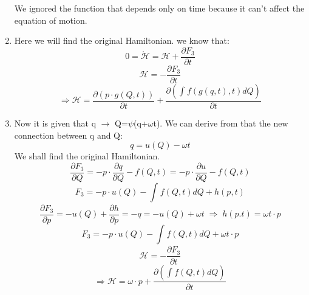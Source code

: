 \documentclass[11pt,fleqn]{article}
\begin{document}
\begin{enumerate}
We ignored the function that depends only on time because it can't affect the equation of motion.
\item Here we will find the original Hamiltonian.
\newline
we know that:
\begin{equation}
0=\grave{\mathcal{H}}=\mathcal{H}+\frac{\partial F_{3}}{\partial t}
\end{equation}
\begin{equation}
\mathcal{H}=-\frac{\partial F_{3}}{\partial t}
\end{equation}
\begin{equation}
\Rightarrow\boxed{\mathcal{H}=\frac{\partial (p\cdot g(Q,t))}{\partial t}+\frac{\partial (\int_{}^{}f(g(q,t),t)dQ)}{\partial t}}
\end{equation}
\item Now it is given that q $\to$ Q=$\psi$(q+$\omega$t). We can derive from that the new connection between q and Q:
\begin{equation}
q=u(Q)-\omega t
\end{equation}
We shall find the original Hamiltonian.
\begin{equation}
\frac{\partial F_{3}}{\partial Q}=-p\cdot\frac{\partial q}{\partial Q}-f(Q,t)=-p\cdot \frac{\partial u}{\partial Q} -f(Q,t)
\end{equation}
\begin{equation}
F_{3}=-p\cdot u(Q)-\int_{}^{} f(Q,t)dQ+h(p,t)
\end{equation}
\begin{equation}
\frac{\partial F_{3}}{\partial p}=-u(Q)+\frac{\partial h}{\partial p}=-q=-u(Q)+\omega t \; \Rightarrow\; h(p.t)=\omega t \cdot p
\end{equation}
\begin{equation}
F_{3}=-p\cdot u(Q)-\int_{}^{} f(Q,t)dQ+ \omega t \cdot p
\end{equation}
\begin{equation}
\mathcal{H}=-\frac{\partial F_{3}}{\partial t}
\end{equation}
\begin{equation}
\Rightarrow\boxed{\mathcal{H}=\omega \cdot p+ \frac{\partial (\int_{}^{}f(Q,t)dQ)}{\partial t}}
\end{equation}
\end{enumerate}

\end{document}
